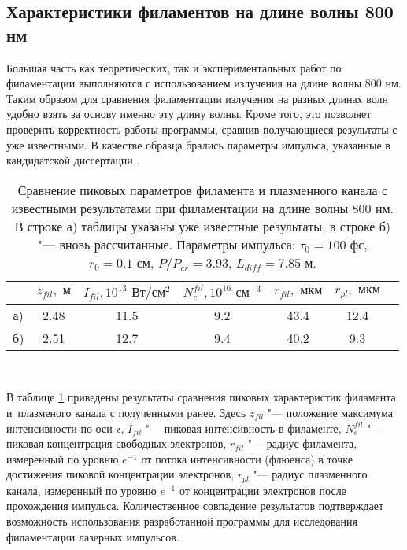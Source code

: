 \subsection{Характеристики филаментов на длине волны 800 нм}

Большая часть как теоретических, так и экспериментальных работ по филаментации выполняются с использованием излучения на длине волны 800 нм.
Таким образом для сравнения филаментации излучения на разных длинах волн удобно взять за основу именно эту длину волны.
Кроме того, это позволяет проверить корректность работы программы, сравнив получающиеся результаты с уже известными.
В качестве образца брались параметры импульса, указанные в кандидатской диссертации \cite{FedorovPhD2010}.

\begin{table}[H]
\begin{center}
\begin{tabular}{|c|c|c|c|c|c|c|}
\hline
  & $z_{fil}, \textrm{ м}$ & $I_{fil}, 10^{13} \textrm{ Вт}/\textrm{см}^2$ & $N_e^{fil}, 10^{16} \textrm{ см}^{-3}$ & $r_{fil}, \textrm{ мкм}$ & $r_{pl}, \textrm{ мкм}$ \\
\hline
а) & 2.48                  & 11.5                                          & 9.2                              & 43.4                     & 12.4                    \\
\hline
б) & 2.51                  & 12.7                                          & 9.4                              & 40.2                     & 9.3                     \\
\hline
\end{tabular}
\\[1ex]
\caption{Сравнение пиковых параметров филамента и плазменного канала с известными результатами при филаментации на длине волны 800 нм.
         В строке а) таблицы указаны уже известные результаты, в строке б) "--- вновь рассчитанные.
         Параметры импульса: $\tau_0 = 100 \textrm{ фс}$, $r_0 = 0.1 \textrm{ см}$, $P/P_{cr} = 3.93$, $L_{diff} = 7.85 \textrm{ м}$.}
\label{tab:PulsesCompareWithFedorov}
\end{center}
\end{table}

В таблице \ref{tab:PulsesCompareWithFedorov} приведены результаты сравнения пиковых характеристик филамента и~плазменого канала с полученными ранее.
Здесь $z_{fil}$ "--- положение максимума интенсивности по оси z, $I_{fil}$ "--- пиковая интенсивность в филаменте, $N_e^{fil}$ "--- пиковая концентрация свободных электронов, $r_{fil}$ "--- радиус филамента,
измеренный по уровню $e^{-1}$ от потока интенсивности (флюенса) в точке достижения пиковой концентрации электронов, $r_{pl}$ "--- радиус плазменного канала,
измеренный по уровню $e^{-1}$ от концентрации электронов после прохождения импульса. Количественное совпадение результатов подтверждает
возможность использования разработанной программы для исследования филаментации лазерных импульсов.

